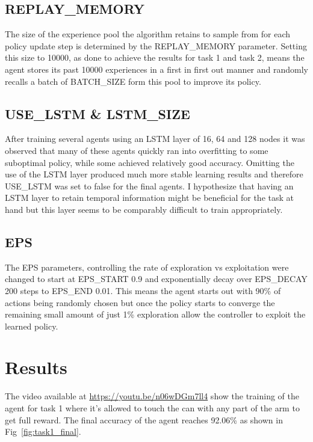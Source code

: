 \documentclass[10pt,journal,compsoc]{IEEEtran}
\begin{document}
\subsection*{REPLAY\_MEMORY} 
The size of the experience pool the algorithm retains to sample from for each policy update step is determined by the REPLAY\_MEMORY parameter. Setting this size to 10000, as done to achieve the results for task 1 and task 2, means the agent stores its past 10000 experiences in a first in first out manner and randomly recalls a batch of BATCH\_SIZE form this pool to improve its policy.

\subsection*{USE\_LSTM \& LSTM\_SIZE} 
After training several agents using an LSTM layer of 16, 64 and 128 nodes it was observed that many of these agents quickly ran into overfitting to some suboptimal policy, while some achieved relatively good accuracy. Omitting the use of the LSTM layer produced much more stable learning results and therefore USE\_LSTM was set to false for the final agents. I hypothesize that having an LSTM layer to retain temporal information might be beneficial for the task at hand but this layer seems to be comparably difficult to train appropriately.

\subsection*{EPS} 
The EPS parameters, controlling the rate of exploration vs exploitation were changed to start at EPS\_START 0.9 and exponentially decay over EPS\_DECAY 200 steps to EPS\_END 0.01. This means the agent starts out with 90\% of actions being randomly chosen but once the policy starts to converge the remaining small amount of just 1\% exploration allow the controller to exploit the learned policy.


\section{Results}  

The video available at \href{https://youtu.be/n06wDGm7ll4}{https://youtu.be/n06wDGm7ll4} show the training of the agent for task 1 where it's allowed to touch the can with any part of the arm to get full reward.
The final accuracy of the agent reaches 92.06\% as shown in Fig~\ref{fig:task1_final}.
\end{document}
